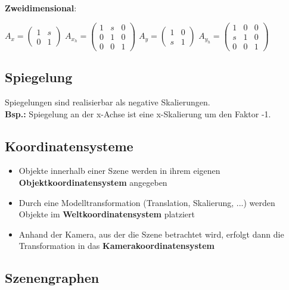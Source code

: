 \documentclass[10pt,a4paper]{article}
\begin{document}
	\textbf{Zweidimensional}:
	\begin{center}
		$A_{x} = \begin{pmatrix}1 & s \\ 0 & 1\end{pmatrix}$\hfill
		$A_{x_h} = \begin{pmatrix}1 & s & 0 \\ 0 & 1 & 0 \\ 0 & 0 & 1\end{pmatrix}$\hfill
		$A_{y} = \begin{pmatrix}1 & 0 \\ s & 1\end{pmatrix}$\hfill
		$A_{y_h} = \begin{pmatrix}1 & 0 & 0 \\ s & 1 & 0 \\ 0 & 0 & 1\end{pmatrix}$\hfill
	\end{center}	

	\subsection{Spiegelung}
	\label{tf:sub:spiegelung}
	
	Spiegelungen sind realisierbar als negative Skalierungen.\\\textbf{Bsp.:} Spiegelung an der x-Achse ist eine x-Skalierung um den Faktor -1.

	\subsection{Koordinatensysteme}
	\label{tf:sub:koordinatensysteme}
	
	\begin{itemize}
		\item Objekte innerhalb einer Szene werden in ihrem eigenen \textbf{Objektkoordinatensystem} angegeben
		\item Durch eine Modelltransformation (Translation, Skalierung, ...) werden Objekte im \textbf{Weltkoordinatensystem} platziert
		\item Anhand der Kamera, aus der die Szene betrachtet wird, erfolgt dann die Transformation in das \textbf{Kamerakoordinatensystem}
	\end{itemize}

	\subsection{Szenengraphen}
	\label{tf:sub:szenengraphen}
	
\end{document}
